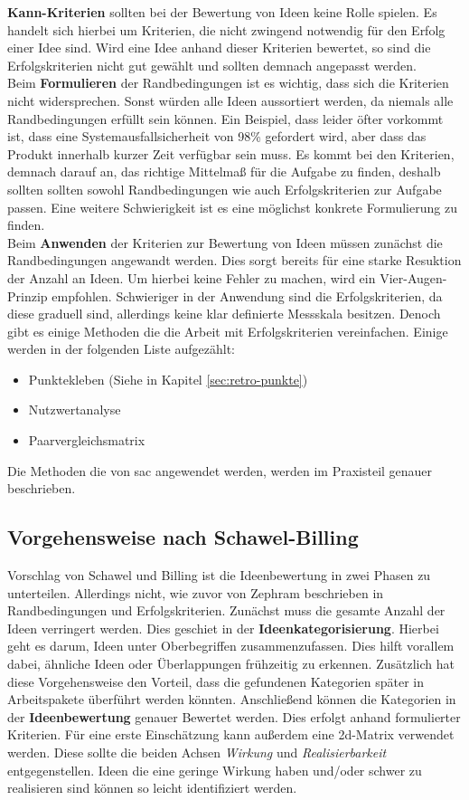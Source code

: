 \textbf{Kann-Kriterien} sollten bei der Bewertung von Ideen keine Rolle spielen. Es handelt sich hierbei 
um Kriterien, die nicht zwingend notwendig für den Erfolg einer Idee sind. Wird eine Idee anhand dieser Kriterien 
bewertet, so sind die Erfolgskriterien nicht gut gewählt und sollten demnach angepasst werden.\\

Beim \textbf{Formulieren} der Randbedingungen ist es wichtig, dass sich die Kriterien nicht
widersprechen. Sonst würden alle Ideen aussortiert werden, da niemals alle Randbedingungen erfüllt sein können.
Ein Beispiel, dass leider öfter vorkommt ist, dass eine Systemausfallsicherheit von 98\% gefordert wird, aber dass das Produkt innerhalb kurzer Zeit verfügbar sein muss. 
Es kommt bei den Kriterien, demnach darauf an, das richtige Mittelmaß für die Aufgabe zu finden, 
deshalb sollten sollten sowohl Randbedingungen wie auch Erfolgskriterien zur Aufgabe passen. Eine weitere Schwierigkeit 
ist es eine möglichst konkrete Formulierung zu finden.\\
Beim \textbf{Anwenden} der Kriterien zur Bewertung von Ideen müssen zunächst die Randbedingungen angewandt werden. 
Dies sorgt bereits für eine starke Resuktion der Anzahl an Ideen. Um hierbei keine Fehler zu machen, wird 
ein Vier-Augen-Prinzip empfohlen. 
Schwieriger in der Anwendung sind die Erfolgskriterien, da diese graduell sind, allerdings keine klar definierte Messskala 
besitzen. Denoch gibt es einige Methoden die die Arbeit mit Erfolgskriterien vereinfachen. Einige werden 
in der folgenden Liste aufgezählt: 
\begin{itemize}
    \item Punktekleben (Siehe in Kapitel \ref{sec:retro-punkte})
    \item Nutzwertanalyse
    \item Paarvergleichsmatrix
\end{itemize}
Die Methoden die von \ac{sac} angewendet werden, werden im Praxisteil genauer beschrieben. \cite{zephram:2018}

\subsection{Vorgehensweise nach Schawel-Billing}
Vorschlag von Schawel und Billing ist die Ideenbewertung in zwei Phasen zu unterteilen. Allerdings nicht, 
wie zuvor von Zephram beschrieben in Randbedingungen und Erfolgskriterien. Zunächst muss die gesamte Anzahl 
der Ideen verringert werden. Dies geschiet in der \textbf{Ideenkategorisierung}. Hierbei geht es darum, Ideen unter 
Oberbegriffen zusammenzufassen. Dies hilft vorallem dabei, ähnliche Ideen oder Überlappungen frühzeitig zu erkennen.
Zusätzlich hat diese Vorgehensweise den Vorteil, dass die gefundenen Kategorien später in Arbeitspakete überführt werden 
könnten. Anschließend können die Kategorien in der \textbf{Ideenbewertung} genauer Bewertet werden. 
Dies erfolgt anhand formulierter Kriterien. Für eine erste Einschätzung kann außerdem eine \ac{2d}-Matrix verwendet werden. 
Diese sollte die beiden Achsen \textit{Wirkung} und \textit{Realisierbarkeit} entgegenstellen. Ideen die eine geringe Wirkung haben und/oder 
schwer zu realisieren sind können so leicht identifiziert werden. \cite{schawel:2009}